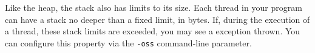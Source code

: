 Like the heap, the stack also has limits to its size. Each thread in your
program can have a stack no deeper than a fixed limit, in bytes. If, during the
execution of a thread, these stack limits are exceeded, you may see a
 exception
thrown. You can configure this property via
the {\tt -oss} command-line parameter.


%




